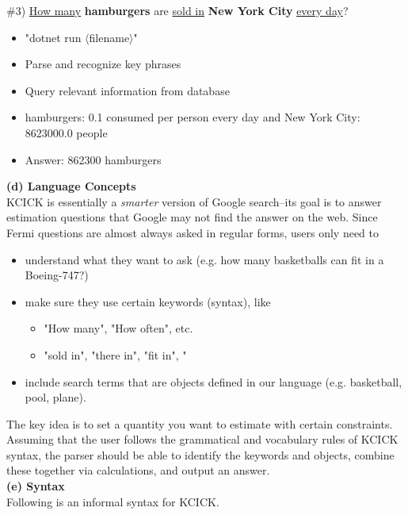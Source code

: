 \documentclass{article}
\begin{document}
\#3) \underline{How many} \textbf{hamburgers} are \underline{sold in} \textbf{New York City} \underline{every day}?
\begin{itemize}
    \item "dotnet run $\langle$filename$\rangle$"
    \item Parse and recognize key phrases
    \item Query relevant information from database 
    \item hamburgers: 0.1 consumed per person every day and New York City: 8623000.0 people
    \item Answer: 862300 hamburgers
\end{itemize}

\vspace{10pt}
             
{\large{\textbf{(d) Language Concepts }}}\\  

KCICK is essentially a \emph{smarter} version of Google search--its goal is to answer estimation questions that Google may not find the answer on the web. Since Fermi questions are almost always asked in regular forms, users only need to 
\begin{itemize}
    \item understand what they want to ask (e.g. how many basketballs can fit in a Boeing-747?)
    \item make sure they use certain keywords (syntax), like 
    \begin{itemize}
        \item "How many", "How often", etc.
        \item "sold in", "there in", "fit in", "
    \end{itemize}
    \item include search terms that are objects defined in our language (e.g. basketball, pool, plane).
\end{itemize}
The key idea is to set a quantity you want to estimate with certain constraints. Assuming that the user follows the grammatical and vocabulary rules of KCICK syntax, the parser should be able to identify the keywords and objects, combine these together via calculations, and output an answer. \\

\newpage
{\large{\textbf{(e) Syntax }}}\\

Following is an informal syntax for KCICK. \\
\end{document}
